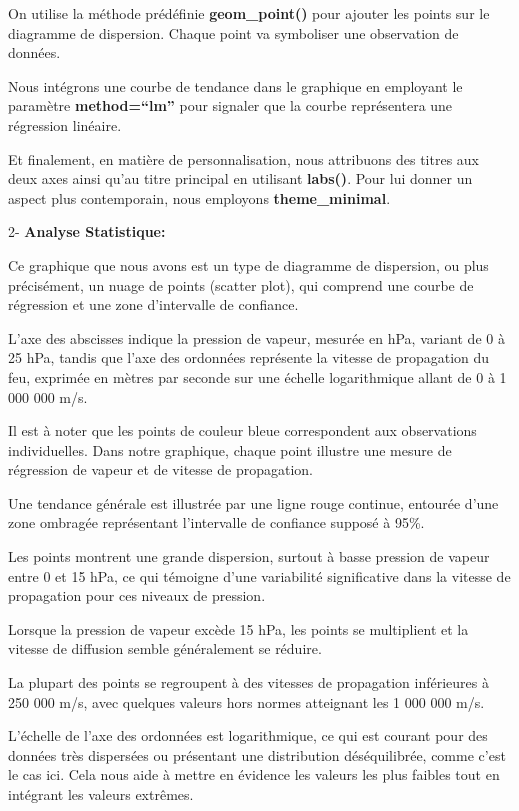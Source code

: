 \documentclass[
]{article}
\begin{document}
On utilise la méthode prédéfinie \textbf{geom\_point()} pour ajouter les
points sur le diagramme de dispersion. Chaque point va symboliser une
observation de données.

Nous intégrons une courbe de tendance dans le graphique en employant le
paramètre \textbf{method=``lm''} pour signaler que la courbe
représentera une régression linéaire.

Et finalement, en matière de personnalisation, nous attribuons des
titres aux deux axes ainsi qu'au titre principal en utilisant
\textbf{labs()}. Pour lui donner un aspect plus contemporain, nous
employons \textbf{theme\_minimal}.

2- \textbf{Analyse Statistique:}

Ce graphique que nous avons est un type de diagramme de dispersion, ou
plus précisément, un nuage de points (scatter plot), qui comprend une
courbe de régression et une zone d'intervalle de confiance.

L'axe des abscisses indique la pression de vapeur, mesurée en hPa,
variant de 0 à 25 hPa, tandis que l'axe des ordonnées représente la
vitesse de propagation du feu, exprimée en mètres par seconde sur une
échelle logarithmique allant de 0 à 1 000 000 m/s.

Il est à noter que les points de couleur bleue correspondent aux
observations individuelles. Dans notre graphique, chaque point illustre
une mesure de régression de vapeur et de vitesse de propagation.

Une tendance générale est illustrée par une ligne rouge continue,
entourée d'une zone ombragée représentant l'intervalle de confiance
supposé à 95\%.

Les points montrent une grande dispersion, surtout à basse pression de
vapeur entre 0 et 15 hPa, ce qui témoigne d'une variabilité
significative dans la vitesse de propagation pour ces niveaux de
pression.

Lorsque la pression de vapeur excède 15 hPa, les points se multiplient
et la vitesse de diffusion semble généralement se réduire.

La plupart des points se regroupent à des vitesses de propagation
inférieures à 250 000 m/s, avec quelques valeurs hors normes atteignant
les 1 000 000 m/s.

L'échelle de l'axe des ordonnées est logarithmique, ce qui est courant
pour des données très dispersées ou présentant une distribution
déséquilibrée, comme c'est le cas ici. Cela nous aide à mettre en
évidence les valeurs les plus faibles tout en intégrant les valeurs
extrêmes.
\end{document}
